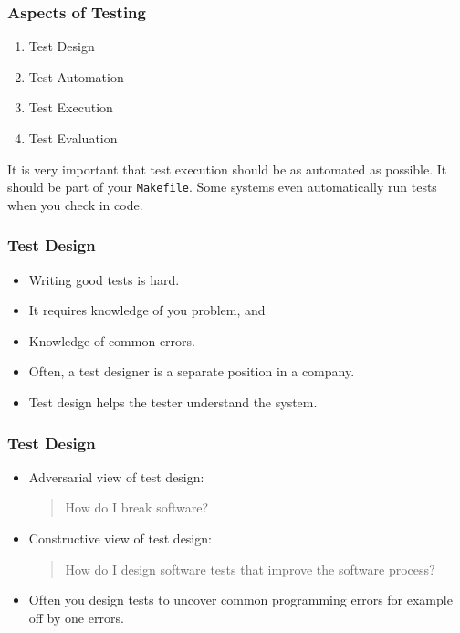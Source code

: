 \documentclass{beamer}
\begin{document}
\begin{frame}
  \frametitle{Aspects of Testing}
  \begin{enumerate}
  \item Test Design
  \item Test Automation
  \item Test Execution
  \item Test Evaluation
  \end{enumerate}
It is very important that test execution should be as automated as possible. It
should be part of your {\tt Makefile}. Some systems even automatically
run tests when you check in code.
\end{frame}
\begin{frame}
  \frametitle{Test Design}
  \begin{itemize}
  \item  Writing good tests is  hard. 
  \item It requires knowledge of you  problem, and 
  \item Knowledge of common errors.
  \item Often, a test designer is a separate  position in a company.
  \item Test design helps the tester understand the system.
  \end{itemize}
\end{frame}
\begin{frame}
  \frametitle{Test Design}
  
  \begin{itemize}
  \item Adversarial view of test design: 
    \begin{quote}
       How do I break software? \pause
    \end{quote}
  \item Constructive view of test design:
    \begin{quote}
       How do I design software tests that improve the software process?
     \end{quote}
   \item Often you design tests to uncover common programming errors
     for example off by one errors.
  \end{itemize}
\end{frame}
\end{document}
